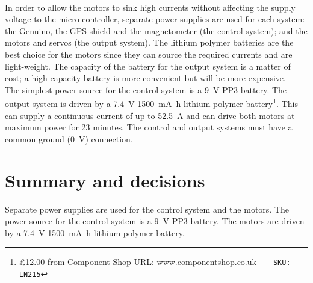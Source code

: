             \paragraph{}In order to allow the motors to sink high currents without affecting the supply voltage to the micro-controller, separate power supplies are used for each system: the \gls{Genuino}, the GPS shield and the magnetometer (the control system); and the motors and servos (the output system). The lithium polymer batteries are the best choice for the motors since they can source the required currents and are light-weight. The capacity of the battery for the output system is a matter of cost; a high-capacity battery is more convenient but will be more expensive.\\
            The simplest power source for the control system is a \SI{9}{\volt} PP3 battery. The output system is driven by a \SI{7.4}{\volt} \SI{1500}{\milli\ampere\hour} lithium polymer battery\footnote{\pounds{12.00} from Component Shop \textsc{URL:} \url{www.componentshop.co.uk}~~~~\texttt{SKU: LN215}}. This can supply a continuous current of up to \SI{52.5}{\ampere} and can drive both motors at maximum power for 23 minutes. The control and output systems must have a common ground (\SI{0}{\volt}) connection.



\section{Summary and decisions}





    Separate power supplies are used for the control system and the motors. The power source for the control system is a \SI{9}{\volt} PP3 battery. The motors are driven by a \SI{7.4}{\volt} \SI{1500}{\milli\ampere\hour} lithium polymer battery.


